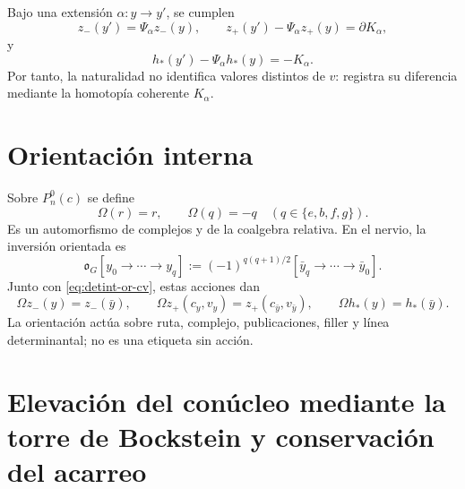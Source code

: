 Bajo una extensión \(\alpha:y\to y'\), se cumplen
\begin{equation}\label{eq:detint-z-natural}
 z_-(y')=\Psi_\alpha z_-(y),
 \qquad
 z_+(y')-\Psi_\alpha z_+(y)=\partial K_\alpha,
\end{equation}
y
\begin{equation}\label{eq:detint-h-natural}
 h_*(y')-\Psi_\alpha h_*(y)=-K_\alpha.
\end{equation}
Por tanto, la naturalidad no identifica valores distintos de \(v\): registra
su diferencia mediante la homotopía coherente \(K_\alpha\).

\section{Orientación interna}

Sobre \(P_n^0(c)\) se define
\begin{equation}\label{eq:detint-omega-p}
 \Omega(r)=r,
 \qquad
 \Omega(q)=-q\quad(q\in\{e,b,f,g\}).
\end{equation}
Es un automorfismo de complejos y de la coalgebra relativa. En el nervio,
la inversión orientada es
\begin{equation}\label{eq:detint-omega-g}
 \mathfrak o_G[y_0\to\cdots\to y_q]
 :=(-1)^{q(q+1)/2}
 [\bar y_q\to\cdots\to\bar y_0].
\end{equation}
Junto con \eqref{eq:detint-or-cv}, estas acciones dan
\begin{equation}\label{eq:detint-or-z-h}
 \Omega z_-(y)=z_-(\bar y),
 \qquad
 \Omega z_+(c_y,v_y)=z_+(c_{\bar y},v_{\bar y}),
 \qquad
 \Omega h_*(y)=h_*(\bar y).
\end{equation}
La orientación actúa sobre ruta, complejo, publicaciones, filler y línea
determinantal; no es una etiqueta sin acción.

\fi
\section{Elevación del conúcleo mediante la torre de Bockstein y conservación del acarreo}
\label{sec:detint-terminal}

